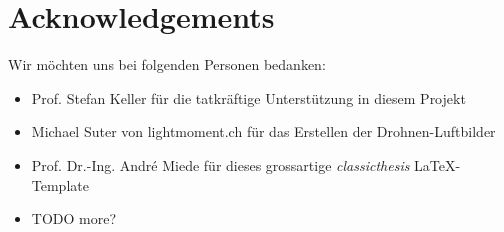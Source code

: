 

\bigskip


\begingroup

\let\clearpage\relax
\let\cleardoublepage\relax
\let\cleardoublepage\relax

\chapter*{Acknowledgements} %

Wir möchten uns bei folgenden Personen bedanken:

\begin{itemize}
	\item Prof. Stefan Keller für die tatkräftige Unterstützung in diesem Projekt
	\item Michael Suter von lightmoment.ch für das Erstellen der
		Drohnen-Luftbilder
	\item Prof. Dr.-Ing. André Miede für dieses grossartige \emph{classicthesis}
		\LaTeX-Template
	\item TODO more?
\end{itemize}


\endgroup
